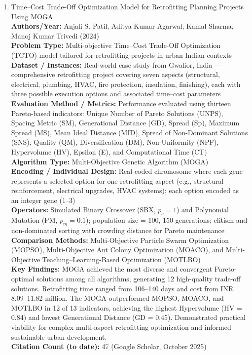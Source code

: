 \documentclass[a4paper,12pt]{article}
\begin{document}
\begin{enumerate}[leftmargin=2em, labelwidth=1em, labelsep=0.5em, itemsep=1ex]
  \item Time–Cost Trade-Off Optimization Model for Retrofitting Planning Projects Using MOGA \\
    \textbf{Authors/Year:} Anjali S. Patil, Aditya Kumar Agarwal, Kamal Sharma, Manoj Kumar Trivedi (2024) \\  
    \textbf{Problem Type:} Multi-objective Time–Cost Trade-Off Optimization (TCTO) model tailored for retrofitting projects in urban Indian contexts \\  
    \textbf{Dataset / Instances:} Real-world case study from Gwalior, India — comprehensive retrofitting project covering seven aspects (structural, electrical, plumbing, HVAC, fire protection, insulation, finishing), each with three possible execution options and associated time–cost parameters \\  
    \textbf{Evaluation Method / Metrics:} Performance evaluated using thirteen Pareto-based indicators: Unique Number of Pareto Solutions (UNPS), Spacing Metric (SM), Generational Distance (GD), Spread (Sp), Maximum Spread (MS), Mean Ideal Distance (MID), Spread of Non-Dominant Solutions (SNS), Quality (QM), Diversification (DM), Non-Uniformity (NPF), Hypervolume (HV), Epsilon (E), and Computational Time (CT) \\  
    \textbf{Algorithm Type:} Multi-Objective Genetic Algorithm (MOGA) \\  
    \textbf{Encoding / Individual Design:} Real-coded chromosome where each gene represents a selected option for one retrofitting aspect (e.g., structural reinforcement, electrical upgrades, HVAC systems); each option encoded as an integer gene (1–3) \\  
    \textbf{Operators:} Simulated Binary Crossover (SBX, $p_c=1$) and Polynomial Mutation (PM, $p_m=0.1$); population size = 100, 150 generations; elitism and non-dominated sorting with crowding distance for Pareto maintenance \\  
    \textbf{Comparison Methods:} Multi-Objective Particle Swarm Optimization (MOPSO), Multi-Objective Ant Colony Optimization (MOACO), and Multi-Objective Teaching–Learning-Based Optimization (MOTLBO) \\  
    \textbf{Key Findings:} MOGA achieved the most diverse and convergent Pareto-optimal solutions among all algorithms, generating 12 high-quality trade-off solutions. Retrofitting time ranged from 106–140 days and cost from INR 8.09–11.82 million. The MOGA outperformed MOPSO, MOACO, and MOTLBO in 12 of 13 indicators, achieving the highest Hypervolume (HV = 0.84) and lowest Generational Distance (GD = 0.45). Demonstrated practical viability for complex multi-aspect retrofitting optimization and informed sustainable urban development. \\  
    \textbf{Citation Count (to date):} 47 (Google Scholar, October 2025) \\[2ex]


\end{enumerate}
\end{document}
